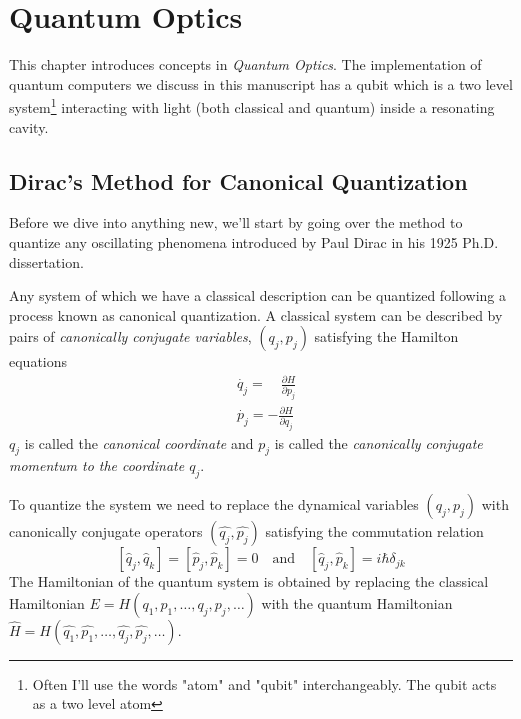 \section{Quantum Optics} \label{chap:quantum-optics}
This chapter introduces concepts in \textit{Quantum Optics}. The implementation of quantum computers we discuss in this manuscript has a qubit which is a two level system\footnote{Often I'll use the words "atom" and "qubit" interchangeably. The qubit acts as a two level atom} interacting with light (both classical and quantum) inside a resonating cavity.

\subsection{Dirac's Method for Canonical Quantization}
Before we dive into anything new, we'll start by going over the method to quantize any oscillating phenomena introduced by Paul Dirac in his 1925 Ph.D. dissertation.

Any system of which we have a classical description can be quantized following a process known as canonical quantization. A classical system can be described by pairs of \textit{canonically conjugate variables}, $ (q_j, p_j)$ satisfying the Hamilton equations
\begin{align*}
    &\dot{q_j} =\quad \frac{\partial H}{\partial p_j} \\
    &\dot{p_j} = -\frac{\partial H}{\partial q_j}
\end{align*}
$q_j$ is called    the \textit{canonical coordinate} and $p_j$ is called the \textit{canonically conjugate momentum to the coordinate $q_j$}.

To quantize the system we need to replace the dynamical variables $ (q_j, p_j)$ with canonically conjugate operators $ (\hat{q_j}, \hat{p_j})$ satisfying the commutation relation 
\[
[\hat{q}_j, \hat{q}_k] = [\hat{p}_j, \hat{p}_k] = 0 \quad  \text{and} \quad [\hat{q}_j, \hat{p}_k] = i\hbar \delta_{jk}
\]
The Hamiltonian of the quantum system is obtained by replacing the classical Hamiltonian $E = H (q_1,p_1, \dots ,q_j, p_j, \dots)$ with the quantum Hamiltonian $\hat{H} = H (\hat{q_1},\hat{p_1}, \dots ,\hat{q_j}, \hat{p_j}, \dots)$. 

